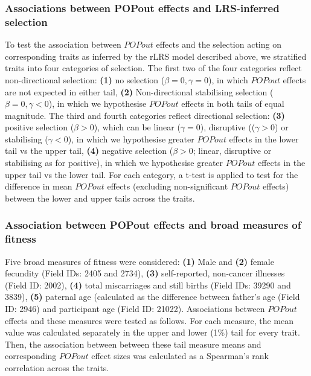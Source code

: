 \documentclass[12pt]{zHenriquesLab-StyleBioRxiv}
\begin{document}
\subsubsection*{Associations between POPout effects and LRS-inferred selection}
To test the association between $POPout$ effects and the selection acting on 
corresponding traits as inferred by the rLRS model described above, we stratified 
traits into four categories of selection. The first two of the four categories reflect non-directional 
selection: \textbf{(1)} no selection ($\beta=0,\gamma=0$), in which $POPout$ 
effects are not expected in either tail, \textbf{(2)} Non-directional stabilising 
selection ($\beta=0,\gamma<0$), in which we hypothesise $POPout$ effects 
in both tails of equal magnitude. The third and fourth categories reflect directional selection: 
\textbf{(3)} positive selection ($\beta>0$), which can be linear ($\gamma=0$), disruptive 
(($\gamma>0$) or stabilising ($\gamma<0$), in which we hypothesise greater 
$POPout$ effects in the lower tail vs the upper tail, \textbf{(4)} negative 
selection ($\beta>0$; linear, disruptive or stabilising as for positive), in which we 
hypothesise greater $POPout$ effects in the upper tail vs the lower tail. For each category, 
a t-test is applied to test for the difference in mean $POPout$ effects (excluding non-significant 
$POPout$ effects) between the lower and upper tails across the traits.

\subsubsection*{Association between POPout effects and broad measures of fitness}
Five broad measures of fitness were considered: \textbf{(1)} Male and \textbf{(2)} female 
fecundity (Field IDs: 2405 and 2734), \textbf{(3)} self-reported, non-cancer illnesses 
(Field ID: 2002), \textbf{(4)} total miscarriages and still births (Field IDs: 39290 and 3839), 
\textbf{(5)} paternal age (calculated as the difference between father's age (Field ID: 2946) 
and participant age (Field ID: 21022). Associations between $POPout$ effects and these 
measures were tested as follows. For each measure, the mean value was calculated 
separately in the upper and lower (1\%) tail for every trait. Then, the association between 
between these tail measure means and corresponding $POPout$ effect sizes was 
calculated as a Spearman's rank correlation across the traits.
\end{document}
